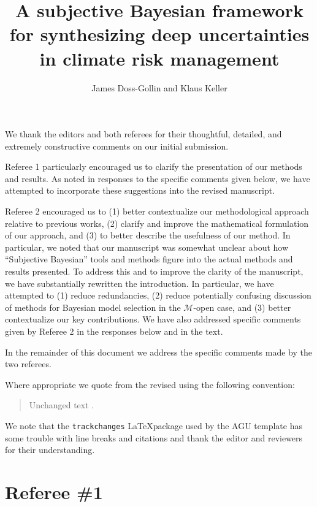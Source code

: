 \documentclass{ar2rc}
\title{A subjective Bayesian framework for synthesizing deep uncertainties in climate risk management}
\author{James Doss-Gollin and Klaus Keller}
\begin{document}
\maketitle

We thank the editors and both referees for their thoughtful, detailed, and extremely constructive comments on our initial submission.

Referee 1 particularly encouraged us to clarify the presentation of our methods and results.
As noted in responses to the specific comments given below, we have attempted to incorporate these suggestions into the revised manuscript.

Referee 2 encouraged us to (1) better contextualize our methodological approach relative to previous works, (2) clarify and improve the mathematical formulation of our approach, and (3) to better describe the usefulness of our method.
In particular, we noted that our manuscript was somewhat unclear about how ``Subjective Bayesian'' tools and methods figure into the actual methods and results presented.
To address this and to improve the clarity of the manuscript, we have substantially rewritten the introduction.
In particular, we have attempted to (1) reduce redundancies, (2) reduce potentially confusing discussion of methods for Bayesian model selection in the $\mathcal{M}$-open case, and (3) better contextualize our key contributions.
We have also addressed specific comments given by Referee 2 in the responses below and in the text.

In the remainder of this document we address the specific comments made by the two referees.

Where appropriate we quote from the revised using the following convention:
\begin{quote}
    Unchanged text
    \DIFdelbegin {}\DIFdelend \DIFaddbegin {}\DIFaddend.
\end{quote}
We note that the \texttt{trackchanges} \LaTeX package used by the AGU template has some trouble with line breaks and citations and thank the editor and reviewers for their understanding.

\section{Referee \#1}
\end{document}
